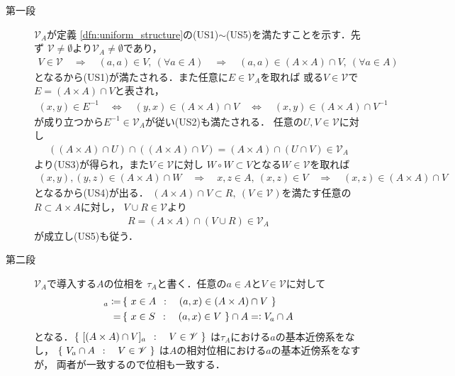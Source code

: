 	\begin{prf}\mbox{}
		\begin{description}
			\item[第一段] $\mathscr{V}_A$が定義
				\ref{dfn:uniform_structure}の(US1)$\sim$(US5)を満たすことを示す．先ず
				$\mathscr{V} \neq \emptyset$より$\mathscr{V}_A \neq \emptyset$であり，
				\begin{align}
					V \in \mathscr{V} \quad \Longrightarrow \quad
					(a,a) \in V,\ (\forall a \in A) \quad \Longrightarrow \quad
					(a,a) \in (A \times A) \cap V,\ (\forall a \in A)
				\end{align}
				となるから(US1)が満たされる．また任意に$E \in \mathscr{V}_A$を取れば
				或る$V \in \mathscr{V}$で$E = (A \times A) \cap V$と表され，
				\begin{align}
					(x,y) \in E^{-1}
					\quad \Longleftrightarrow \quad
					(y,x) \in (A \times A) \cap V 
					\quad \Longleftrightarrow \quad
					(x,y) \in (A \times A) \cap V^{-1}
				\end{align}
				が成り立つから$E^{-1} \in \mathscr{V}_A$が従い(US2)も満たされる．
				任意の$U,V \in \mathscr{V}$に対し
				\begin{align}
					((A \times A) \cap U) \cap ((A \times A) \cap V)
					= (A \times A) \cap (U \cap V) \in \mathscr{V}_A
				\end{align}
				より(US3)が得られ，また$V \in \mathscr{V}$に対し
				$W \circ W \subset V$となる$W \in \mathscr{V}$を取れば
				\begin{align}
					(x,y),(y,z) \in (A \times A) \cap W
					\quad \Longrightarrow \quad
					x,z \in A,\ (x,z) \in V
					\quad \Longrightarrow \quad
					(x,z) \in (A \times A) \cap V
				\end{align}
				となるから(US4)が出る．
				$(A \times A) \cap V \subset R,\ (V \in \mathscr{V})$を満たす任意の
				$R \subset A \times A$に対し，
				$V \cup R \in \mathscr{V}$より
				\begin{align}
					R = (A \times A) \cap (V \cup R) \in \mathscr{V}_A
				\end{align}
				が成立し(US5)も従う．
			
			\item[第二段] $\mathscr{V}_A$で導入する$A$の位相を
				$\tau_A$と書く．任意の$a \in A$と$V \in \mathscr{V}$に対して
				\begin{align}
					[(A \times A) \cap V]_a \coloneqq
					&\Set{x \in A}{(a,x) \in (A \times A) \cap V} \\
					=& \Set{x \in S}{(a,x) \in V} \cap A
					\eqqcolon V_a \cap A
				\end{align}
				となる．$\left\{\ [(A \times A) \cap V]_a\ \, : \quad V \in \mathscr{V}\ \right\}$
				は$\tau_A$における$a$の基本近傍系をなし，
				$\left\{\ V_a \cap A\ \, : \quad V \in \mathscr{V}\ \right\}$
				は$A$の相対位相における$a$の基本近傍系をなすが，
				両者が一致するので位相も一致する．
				\QED
		\end{description}
	\end{prf}
	
